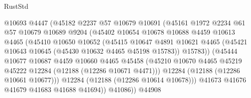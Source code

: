 \begin{lexlean}{RustStd}
\begin{coremodule}
                              @10693
                              @4447
                              (@45182
                                @2237
                                @57
                                @10679
                                @10691
                                (@45161
                                  @1972
                                  @2234
                                  @61
                                  @57
                                  @10679
                                  @10689
                                  @9204
                                  (@45402
                                    @10654
                                    @10678
                                    @10688
                                    @4459
                                    @10613
                                    @4465
                                    (@45410
                                      @10650
                                      @10652
                                      (@45415
                                        @10647
                                        @4891
                                        @10621
                                        @4465
                                        (@45421 @10643 @10645 (@45430 @10632 @4465 @45198 @15783))
                                        @15783))
                                    (@45444
                                      @10677
                                      @10687
                                      @4459
                                      @10660
                                      @4465
                                      @45458
                                      (@45210
                                        @10670
                                        @4465
                                        @45219
                                        @45222
                                        @12284
                                        (@12188 (@12286 @10671 @4471)))
                                      @12284
                                      (@12188 (@12286 @10661 @10677)))
                                    @12284
                                    (@12188 (@12286 @10614 @10678)))
                                  @41673
                                  @41676
                                  @41679
                                  @41683
                                  @41688
                                  @41694))
                              @41086))
                          @44908

\end{coremodule}
\end{lexlean}
